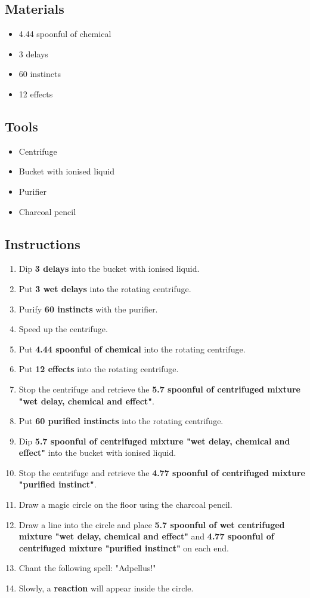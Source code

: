 \documentclass{article}
\begin{document}
\subsection{Materials}\begin{itemize}
\item 
4.44 spoonful of chemical
\item 
3 delays
\item 
60 instincts
\item 
12 effects
\end{itemize}
\subsection{Tools}\begin{itemize}
\item 
Centrifuge
\item 
Bucket with ionised liquid
\item 
Purifier
\item 
Charcoal pencil
\end{itemize}
\subsection{Instructions}\begin{enumerate}
\item 
Dip \textbf{3 delays} into the bucket with ionised liquid.
\item 
Put \textbf{3 wet delays} into the rotating centrifuge.
\item 
Purify \textbf{60 instincts} with the purifier.
\item 
Speed up the centrifuge.
\item 
Put \textbf{4.44 spoonful of chemical} into the rotating centrifuge.
\item 
Put \textbf{12 effects} into the rotating centrifuge.
\item 
Stop the centrifuge and retrieve the \textbf{5.7 spoonful of centrifuged mixture "wet delay, chemical and effect"}.
\item 
Put \textbf{60 purified instincts} into the rotating centrifuge.
\item 
Dip \textbf{5.7 spoonful of centrifuged mixture "wet delay, chemical and effect"} into the bucket with ionised liquid.
\item 
Stop the centrifuge and retrieve the \textbf{4.77 spoonful of centrifuged mixture "purified instinct"}.
\item 
Draw a magic circle on the floor using the charcoal pencil.
\item 
Draw a line into the circle and place \textbf{5.7 spoonful of wet centrifuged mixture "wet delay, chemical and effect"} and \textbf{4.77 spoonful of centrifuged mixture "purified instinct"} on each end.
\item 
Chant the following spell: "Adpellus!"
\item 
Slowly, a \textbf{reaction} will appear inside the circle.
\end{enumerate}
\newpage
\end{document}

